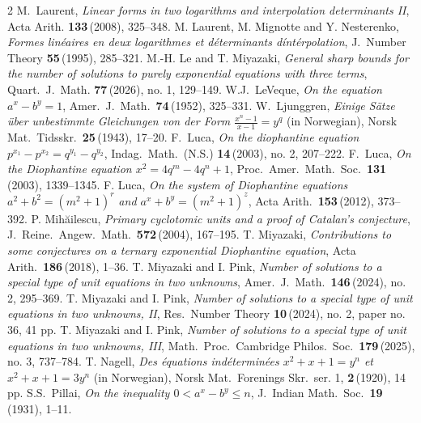 \documentclass[11pt]{amsart}
\numberwithin{equation}{section}
\begin{document}
\begin{thebibliography}{2}
%
M.~Laurent,
{\it Linear forms in two logarithms and interpolation determinants II},
Acta Arith. {\bf 133}\,(2008), 325--348.
%
M. Laurent, M. Mignotte and Y. Nesterenko,
{\it Formes lin\'eaires en deux logarithmes et d\'eterminants d\'int\'erpolation},
J.\ Number Theory {\bf 55}\,(1995), 285--321.
%
M.-H. Le and T. Miyazaki,
{\it General sharp bounds for the number of solutions to purely exponential equations with three terms},
Quart.\ J.\ Math. {\bf 77}\,(2026), no. 1, 129--149.
%
W.J.~LeVeque,
{\it On the equation $a^x-b^y=1$},
Amer.\ J.\ Math.\ {\bf 74}\,(1952), 325--331.
%
W.~Ljunggren,
{\it Einige S\"atze \"uber unbestimmte Gleichungen von der Form $\frac{x^n-1}{x-1}=y^q$} (in Norwegian),
Norsk Mat.\ Tidsskr.\ {\bf 25}\,(1943), 17--20.
%
F.~Luca,
{\it On the diophantine equation $p^{x_1}-p^{x_2}=q^{y_1}-q^{y_2}$},
Indag.\ Math.\ (N.S.) {\bf 14}\,(2003), no. 2, 207--222.
%
F.~Luca, 
{\it On the Diophantine equation $x^2=4q^m-4q^n+1$}, 
Proc.\ Amer.\ Math.\ Soc.\ {\bf 131}\,(2003), 1339--1345. 
%
F. Luca,
{\it On the system of Diophantine equations $a^2+b^2=(m^2+1)^r$ and $a^x+b^y=(m^2+1)^z$},
Acta Arith.\ {\bf 153}\,(2012), 373--392.
%
P. Mih\u{a}ilescu,
{\it Primary cyclotomic units and a proof of Catalan's conjecture},
J.\ Reine.\ Angew.\ Math.\ {\bf 572}\,(2004), 167--195.
%
T. Miyazaki,
{\it Contributions to some conjectures on a ternary exponential Diophantine equation},
Acta Arith.\ {\bf 186}\,(2018), 1--36.
%
T. Miyazaki and I. Pink,
{\it Number of solutions to a special type of unit equations in two unknowns}, 
Amer.\ J.\ Math.\ {\bf 146}\,(2024), no. 2, 295--369.
%
T. Miyazaki and I. Pink,
{\it Number of solutions to a special type of unit equations in two unknowns, I\hspace{-1.2pt}I}, 
Res.\ Number Theory {\bf 10}\,(2024), no. 2, paper no. 36, 41 pp.
%
T. Miyazaki and I. Pink,
{\it Number of solutions to a special type of unit equations in two unknowns, I\hspace{-1.2pt}I\hspace{-1.2pt}I}, 
Math.\ Proc.\ Cambridge Philos.\ Soc.\ {\bf 179}\,(2025), no. 3, 737--784. 
%
T. Nagell, 
{\it Des \'equations ind\'etermin\'ees $x^2+x+1=y^n$ et $x^2+x+1=3y^n$} (in Norwegian), 
Norsk Mat.\ Forenings Skr.\ ser. 1, {\bf 2}\,(1920), 14 pp.
%
S.S.~Pillai,
{\it On the inequality $0<a^x-b^y \le n$}, J.\ Indian Math.\ Soc.\ {\bf 19}\,(1931), 1--11.

\end{thebibliography}
\end{document}
